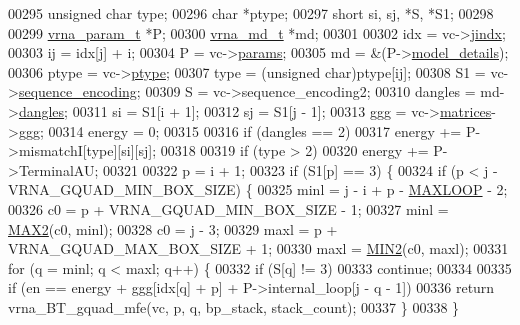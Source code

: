\begin{DoxyCode}
00295   \textcolor{keywordtype}{unsigned} \textcolor{keywordtype}{char} type;
00296   \textcolor{keywordtype}{char}          *ptype;
00297   \textcolor{keywordtype}{short}         si, sj, *S, *S1;
00298 
00299   \hyperlink{group__energy__parameters_structvrna__param__s}{vrna\_param\_t}  *P;
00300   \hyperlink{group__model__details_structvrna__md__s}{vrna\_md\_t}     *md;
00301 
00302   idx     = vc->\hyperlink{group__fold__compound_a5037235dee512efd85ca543780bbca1a}{jindx};
00303   ij      = idx[j] + i;
00304   P       = vc->\hyperlink{group__fold__compound_a19b8720c2c5321c1b97c830bd17566ea}{params};
00305   md      = &(P->\hyperlink{group__energy__parameters_a7b84353eb9075c595bad4ceb871bcae7}{model\_details});
00306   ptype   = vc->\hyperlink{group__fold__compound_a3fbea559f1d1976b2d67c215cdeee0b2}{ptype};
00307   type    = (\textcolor{keywordtype}{unsigned} char)ptype[ij];
00308   S1      = vc->\hyperlink{group__fold__compound_a9934bdb695d35a3544285cbcc19f9763}{sequence\_encoding};
00309   S       = vc->sequence\_encoding2;
00310   dangles = md->\hyperlink{group__model__details_adcda4ff2ea77748ae0e8700288282efc}{dangles};
00311   si      = S1[i + 1];
00312   sj      = S1[j - 1];
00313   ggg     = vc->\hyperlink{group__fold__compound_aca8be7bdc65bafe2172c6ee777f18568}{matrices}->\hyperlink{group__dp__matrices_a0b7b86a5c75c96eabb89eb53a13e7164}{ggg};
00314   energy  = 0;
00315 
00316   \textcolor{keywordflow}{if} (dangles == 2)
00317     energy += P->mismatchI[type][si][sj];
00318 
00319   \textcolor{keywordflow}{if} (type > 2)
00320     energy += P->TerminalAU;
00321 
00322   p = i + 1;
00323   \textcolor{keywordflow}{if} (S1[p] == 3) \{
00324     \textcolor{keywordflow}{if} (p < j - VRNA\_GQUAD\_MIN\_BOX\_SIZE) \{
00325       minl  = j - i + p - \hyperlink{constants_8h_ad1bd6eabac419670ddd3c9ed82145988}{MAXLOOP} - 2;
00326       c0    = p + VRNA\_GQUAD\_MIN\_BOX\_SIZE - 1;
00327       minl  = \hyperlink{group__utils_ga33297b3679c713b0c4d897cd0fe3b122}{MAX2}(c0, minl);
00328       c0    = j - 3;
00329       maxl  = p + VRNA\_GQUAD\_MAX\_BOX\_SIZE + 1;
00330       maxl  = \hyperlink{group__utils_gae0b9cd0ce090bd69b951aa73e8fa4f7d}{MIN2}(c0, maxl);
00331       \textcolor{keywordflow}{for} (q = minl; q < maxl; q++) \{
00332         \textcolor{keywordflow}{if} (S[q] != 3)
00333           \textcolor{keywordflow}{continue};
00334 
00335         \textcolor{keywordflow}{if} (en == energy + ggg[idx[q] + p] + P->internal\_loop[j - q - 1])
00336           \textcolor{keywordflow}{return} vrna\_BT\_gquad\_mfe(vc, p, q, bp\_stack, stack\_count);
00337       \}
00338     \}

\end{DoxyCode}
